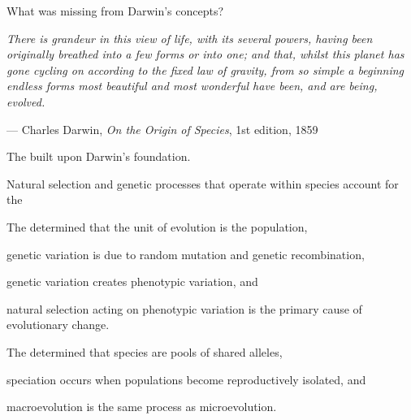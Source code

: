 \documentclass[t,handout]{beamer}  %
\begin{document}

\begin{frame}[t]{What was missing from Darwin's concepts?}
\vspace{-\baselineskip}
\begin{multicols*}{2}
\bigskip


\vfilll

\columnbreak

\noindent\textit{There is grandeur in this view of life, with its several powers, having been originally breathed into a few forms or into one; and that, whilst this planet has gone cycling on according to the fixed law of gravity, from so simple a beginning endless forms most beautiful and most wonderful have been, and are being, evolved.}

\vspace{0.5em}

— Charles Darwin, \textit{On the Origin of Species}, 1st edition, 1859

\end{multicols*}
\end{frame}

\begin{frame}{The  built upon Darwin's foundation.}

\hangpara Natural selection and genetic processes that operate within species account for the 

\end{frame}

\begin{frame}[t]{The  determined that}
\hangpara the unit of evolution is the population,

\hangpara genetic variation is due to random mutation and genetic recombination,

\hangpara genetic variation creates phenotypic variation, and

\hangpara natural selection acting on phenotypic variation is the primary cause of evolutionary change.

\end{frame}

\begin{frame}[t]{The  determined that}
\hangpara species are pools of shared alleles, 

\hangpara speciation occurs when populations become reproductively isolated, and

\hangpara macroevolution is the same process as microevolution.


\end{frame}
\end{document}
